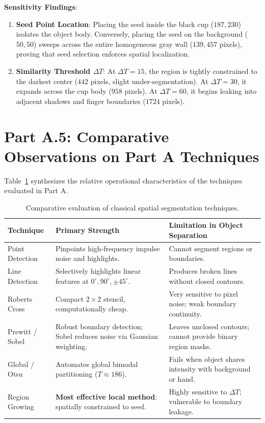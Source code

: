 \documentclass[12pt]{article}
\begin{document}
\textbf{Sensitivity Findings}:
\begin{enumerate}
    \item \textbf{Seed Point Location}: Placing the seed inside the black cup ($187, 230$) isolates the object body. Conversely, placing the seed on the background ($50, 50$) sweeps across the entire homogeneous gray wall ($139,457$ pixels), proving that seed selection enforces spatial localization.
    \item \textbf{Similarity Threshold $\Delta T$}: At $\Delta T = 15$, the region is tightly constrained to the darkest center ($442$ pixels, slight under-segmentation). At $\Delta T = 30$, it expands across the cup body ($958$ pixels). At $\Delta T = 60$, it begins leaking into adjacent shadows and finger boundaries ($1724$ pixels).
\end{enumerate}

\section{Part A.5: Comparative Observations on Part A Techniques}

Table~\ref{tab:comparison} synthesizes the relative operational characteristics of the techniques evaluated in Part A.

\begin{table}[H]
\centering
\small
\begin{tabular}{lp{5.5cm}p{6.5cm}}
\toprule
\textbf{Technique} & \textbf{Primary Strength} & \textbf{Limitation in Object Separation} \\
\midrule
Point Detection & Pinpoints high-frequency impulse noise and highlights. & Cannot segment regions or boundaries. \\
Line Detection & Selectively highlights linear features at $0^\circ, 90^\circ, \pm 45^\circ$. & Produces broken lines without closed contours. \\
Roberts Cross & Compact $2\times 2$ stencil, computationally cheap. & Very sensitive to pixel noise; weak boundary continuity. \\
Prewitt / Sobel & Robust boundary detection; Sobel reduces noise via Gaussian weighting. & Leaves unclosed contours; cannot provide binary region masks. \\
Global / Otsu & Automates global bimodal partitioning ($T \approx 186$). & Fails when object shares intensity with background or hand. \\
Region Growing & \textbf{Most effective local method}: spatially constrained to seed. & Highly sensitive to $\Delta T$; vulnerable to boundary leakage. \\
\bottomrule
\end{tabular}
\caption{Comparative evaluation of classical spatial segmentation techniques.}
\label{tab:comparison}
\end{table}
\end{document}
